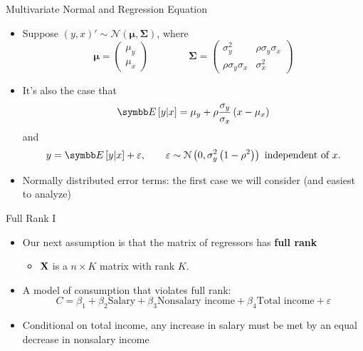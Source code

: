 \documentclass[aspectratio=169,11pt]{beamer}
\begin{document}
\begin{frame}{Multivariate Normal and Regression Equation}
\begin{itemize}

	\item Suppose $\left(y,x\right)' \sim \mathcal{N}\left(\boldsymbol{\mu},\boldsymbol{\Sigma}\right)$, where \[
\boldsymbol{\mu}=\left(\begin{array}{c}
\mu_{y}\\
\mu_{x}
\end{array}\right)\qquad\qquad\boldsymbol{\Sigma}=\left(\begin{array}{cc}
\sigma_{y}^{2} & \rho\sigma_{y}\sigma_{x}\\
\rho\sigma_{y}\sigma_{x} & \sigma_{x}^{2}
\end{array}\right)
\]

	\smallskip
	\item It's also the case that \[
		\E\left[y|x\right] = \mu_y + \rho\frac{\sigma_y}{\sigma_x}\left(x-\mu_x\right)
	\]
	and \[
		y = \E\left[y|x\right] + \varepsilon, \qquad \varepsilon \sim \mathcal{N}\left(0,\sigma_y^2\left(1-\rho^2\right)\right) \text{ independent of } x.
	\]

	\smallskip
	\item Normally distributed error terms: the first case we will consider (and easiest to analyze)

\end{itemize}
\end{frame}


\begin{frame}{Full Rank I}
\begin{itemize}

	\item<1-> Our next assumption is that the matrix of regressors has {\bf full rank}
	\begin{itemize}
		\item<1-> ${\bf X}$ is a $n\times K$ matrix with rank $K$.
	\end{itemize}

	\medskip
	\item<2-> A model of consumption that violates full rank:\[ 
	C = \beta_1 + \beta_2 \text{Salary} + \beta_3 \text{Nonsalary income} + \beta_4 \text{Total income} + \varepsilon
	\]

	\medskip
	\item<3-> Conditional on total income, any increase in salary must be met by an equal decrease
	in nonsalary income


\end{itemize}
\end{frame}
\end{document}
